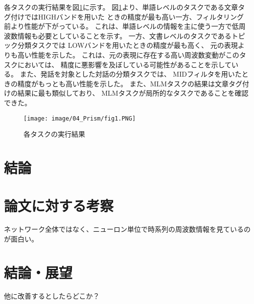 \documentclass{jsarticle}
\begin{document}
各タスクの実行結果を図\ref{fig:fig1}に示す。
図\ref{fig:fig1}より、単語レベルのタスクである文章タグ付けではHIGHバンドを用いた
ときの精度が最も高い一方、フィルタリング前より性能が下がっている。
これは、単語レベルの情報を主に使う一方で低周波数情報も必要としていることを示す。
一方、文書レベルのタスクであるトピック分類タスクでは
LOWバンドを用いたときの精度が最も高く、
元の表現よりも高い性能を示した。
これは、元の表現に存在する高い周波数変動がこのタスクにおいては、
精度に悪影響を及ぼしている可能性があることを示している。
また、発話を対象とした対話の分類タスクでは、
MIDフィルタを用いたときの精度がもっとも高い性能を示した。
また、MLMタスクの結果は文章タグ付けの結果に最も類似しており、
MLMタスクが局所的なタスクであることを確認できた。

\begin{figure}[H]
  \begin{center}
    \texttt{[image: image/04\_Prism/fig1.PNG]}
    \caption{各タスクの実行結果}
    \label{fig:fig1}
  \end{center}
\end{figure}

\section{結論}

\section{論文に対する考察}
ネットワーク全体ではなく、ニューロン単位で時系列の周波数情報を見ているのが面白い。





\section{結論・展望}
他に改善するとしたらどこか？

\end{document}
